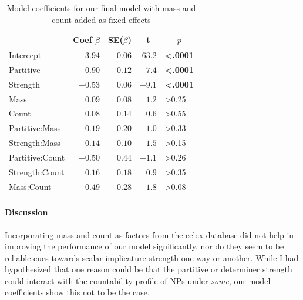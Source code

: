 \documentclass[10pt, biblatex]{report}
\begin{document}
\begin{table}[t]
    \centering
    \begin{tabular}{lrrrl}
    \multicolumn{1}{l}{}&\multicolumn{1}{c}{Coef $\beta$}&\multicolumn{1}{c}{SE($\beta$)}&
    \multicolumn{1}{c}{\textbf{t}}&\multicolumn{1}{c}{$p$}\tabularnewline
    \midrule
    Intercept&$ 3.94$&$0.06$&$63.2$&\textbf{\textless .0001}\tabularnewline
    Partitive&$ 0.90$&$0.12$&$ 7.4$&\textbf{\textless .0001}\tabularnewline
    Strength&$-0.53$&$0.06$&$-9.1$&\textbf{\textless .0001}\tabularnewline
    Mass&$ 0.09$&$0.08$&$ 1.2$&\textgreater 0.25\tabularnewline
    Count&$ 0.08$&$0.14$&$ 0.6$&\textgreater 0.55\tabularnewline
    Partitive:Mass&$ 0.19$&$0.20$&$ 1.0$&\textgreater 0.33\tabularnewline
    Strength:Mass&$-0.14$&$0.10$&$-1.5$&\textgreater 0.15\tabularnewline
    Partitive:Count&$-0.50$&$0.44$&$-1.1$&\textgreater 0.26\tabularnewline
    Strength:Count&$ 0.16$&$0.18$&$ 0.9$&\textgreater 0.35\tabularnewline
    Mass:Count&$ 0.49$&$0.28$&$ 1.8$&\textgreater 0.08\tabularnewline
    \end{tabular}
    \caption{Model coefficients for our final model with {\rmsc mass} and {\rmsc
             count} added as fixed effects}
    \label{tab:coeffs}
\end{table}

\paragraph{Discussion} Incorporating {\rmsc mass} and {\rmsc count} as factors
from the {\rmsc celex} database did not help in improving the performance of
our model significantly, nor do they seem to be reliable cues towards
scalar implicature strength one way or another. While I had hypothesized that
one reason could be that the partitive or determiner strength could interact
with the countability profile of NPs under \textit{some}, our model coefficients
show this not to be the case.
\end{document}
